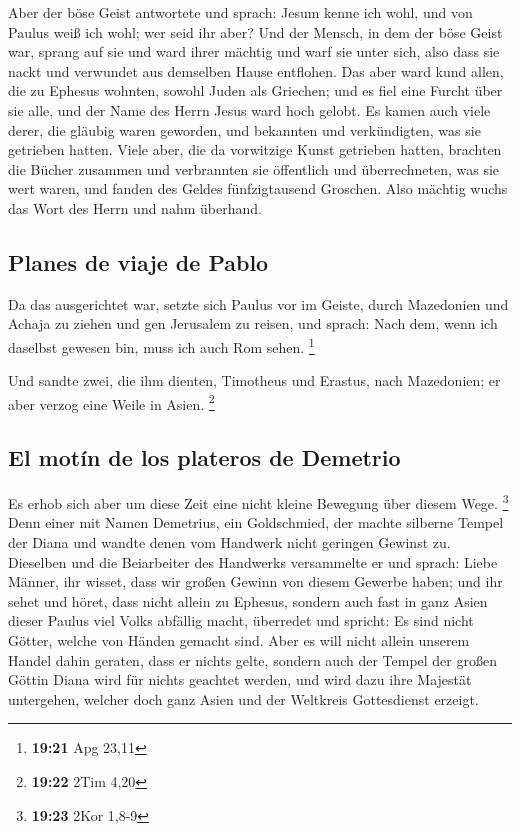  Aber der böse Geist antwortete und sprach: Jesum kenne
ich wohl, und von Paulus weiß ich wohl; wer seid ihr aber?
 Und der Mensch, in dem der böse Geist war, sprang auf
sie und ward ihrer mächtig und warf sie unter sich, also dass sie nackt
und verwundet aus demselben Hause entflohen.  Das aber
ward kund allen, die zu Ephesus wohnten, sowohl Juden als Griechen; und
es fiel eine Furcht über sie alle, und der Name des Herrn Jesus ward
hoch gelobt.  Es kamen auch viele derer, die gläubig
waren geworden, und bekannten und verkündigten, was sie getrieben
hatten.  Viele aber, die da vorwitzige Kunst getrieben
hatten, brachten die Bücher zusammen und verbrannten sie öffentlich und
überrechneten, was sie wert waren, und fanden des Geldes fünfzigtausend
Groschen.  Also mächtig wuchs das Wort des Herrn und nahm
überhand.

\hypertarget{planes-de-viaje-de-pablo}{%
\subsection{Planes de viaje de Pablo}\label{planes-de-viaje-de-pablo}}

 Da das ausgerichtet war, setzte sich Paulus vor im
Geiste, durch Mazedonien und Achaja zu ziehen und gen Jerusalem zu
reisen, und sprach: Nach dem, wenn ich daselbst gewesen bin, muss ich
auch Rom sehen. \footnote{\textbf{19:21} Apg 23,11}

 Und sandte zwei, die ihm dienten, Timotheus und Erastus,
nach Mazedonien; er aber verzog eine Weile in Asien. \footnote{\textbf{19:22}
  2Tim 4,20}

\hypertarget{el-motuxedn-de-los-plateros-de-demetrio}{%
\subsection{El motín de los plateros de
Demetrio}\label{el-motuxedn-de-los-plateros-de-demetrio}}

 Es erhob sich aber um diese Zeit eine nicht kleine
Bewegung über diesem Wege. \footnote{\textbf{19:23} 2Kor 1,8-9}
 Denn einer mit Namen Demetrius, ein Goldschmied, der
machte silberne Tempel der Diana und wandte denen vom Handwerk nicht
geringen Gewinst zu.  Dieselben und die Beiarbeiter des
Handwerks versammelte er und sprach: Liebe Männer, ihr wisset, dass wir
großen Gewinn von diesem Gewerbe haben;  und ihr sehet
und höret, dass nicht allein zu Ephesus, sondern auch fast in ganz Asien
dieser Paulus viel Volks abfällig macht, überredet und spricht: Es sind
nicht Götter, welche von Händen gemacht sind.  Aber es
will nicht allein unserem Handel dahin geraten, dass er nichts gelte,
sondern auch der Tempel der großen Göttin Diana wird für nichts geachtet
werden, und wird dazu ihre Majestät untergehen, welcher doch ganz Asien
und der Weltkreis Gottesdienst erzeigt.


